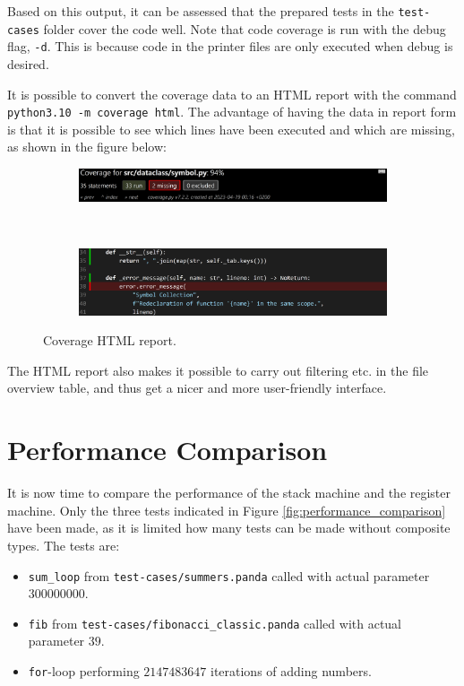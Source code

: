 Based on this output, it can be assessed that the prepared tests in the \texttt{test-cases} folder cover the code well. Note that code coverage is run with the debug flag, \texttt{-d}. This is because code in the printer files are only executed when debug is desired.

It is possible to convert the coverage data to an HTML report with the command \texttt{python3.10 -m coverage html}. The advantage of having the data in report form is that it is possible to see which lines have been executed and which are missing, as shown in the figure below: 

\begin{figure}[H]
    \centering
    \begin{subfigure}{1\textwidth}
        \centering
        \includegraphics[width=1\textwidth]{misc/images/Coverage_Panel.png}
        \end{subfigure}\\
        \begin{subfigure}{1\textwidth}
        \centering
        \includegraphics[width=1\textwidth]{misc/images/Coverage_Info.png}
        \end{subfigure}
    \caption{Coverage HTML report.}
\end{figure}

The HTML report also makes it possible to carry out filtering etc. in the file overview table, and thus get a nicer and more user-friendly interface.

\chapter{Performance Comparison}
It is now time to compare the performance of the stack machine and the register machine. Only the three tests indicated in Figure \ref{fig:performance_comparison} have been made, as it is limited how many tests can be made without composite types. The tests are:

\begin{itemize}
    \item \texttt{sum\_loop} from \texttt{test-cases/summers.panda} called with actual parameter $300000000$.
    \item \texttt{fib} from \texttt{test-cases/fibonacci\_classic.panda} called with actual parameter $39$.
    \item \texttt{for}-loop performing $2147483647$ iterations of adding numbers.
\end{itemize}

